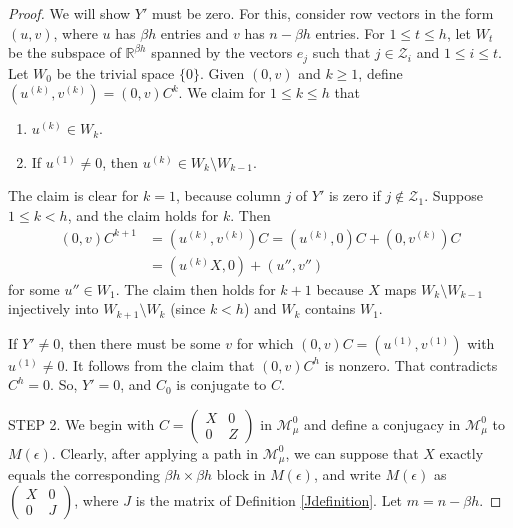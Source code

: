\documentclass{amsart}
\theoremstyle{definition}
\theoremstyle{remark}
\numberwithin{equation}{section}
\begin{document}
{{\begin{proof}
We will show $Y'$ must be zero. For this, 
 consider row vectors in the form $(u,v)$, where 
$u$ has $\beta h$ entries and $v$ has $n-\beta h$ 
entries. 
For $1\leq t \leq h$, 
let $W_t$ be the subspace of $\mathbb R^{\beta h}$ 
spanned by the vectors $e_j$ such that  $j\in \mathcal Z_i$ 
and $1\leq i \leq t$. Let $W_0$ be the trivial 
space $\{0\}$. 
Given $(0,v)$ and $k\geq 1$, 
define  
 $(u^{(k)},v^{(k)})
=(0,v)C^k$.  
We claim for $1\leq k\leq h$ that 
\begin{enumerate} 
\item 
 $u^{(k)}\in  W_k$. 
\item 
If $u^{(1)}\neq 0$, then 
$u^{(k)}\in 
 W_k\setminus W_{k-1}$. 
\end{enumerate} 
The claim is clear for $k=1$, because column 
$j$ of $Y'$ is zero if $j\notin \mathcal Z_1$.  
Suppose $1\leq k<h$,  and 
the claim  holds for $k$. 
 Then 
\begin{align*} 
(0,v)C^{k+1}&= (u^{(k)},v^{(k)})C=
(u^{(k)},0)C + (0,v^{(k)})C \\ 
&= (u^{(k)}X,0) + 
(u'',v'')
\end{align*}  
for some $u''\in W_1$.
The  claim then holds for $k+1$ 
 because $X$ maps 
$ W_k\setminus W_{k-1}$ injectively into 
$ W_{k+1}\setminus W_{k}$ (since $k<h$) 
and $W_k$ contains $W_1$. 

If $Y'\neq 0$, then there must be some $v$ for which 
$ (0,v)C= (u^{(1)},v^{(1)})$ with 
$u^{(1)}\neq 0$. It follows from the claim that 
$(0,v)C^h$ is nonzero. That contradicts 
$C^h=0$. So, $Y'=0$, and $C_0$ is conjugate to $C$. 

STEP 2. 
We begin with 
$C= 
\left(\begin{smallmatrix} X & 0 \\ 0 & Z 
\end{smallmatrix} \right)$ 
in $\mathcal M^0_{\mu}$ and 
define a conjugacy in 
 $\mathcal M^0_{\mu}$ 
 to 
$M(\epsilon)$. 
Clearly, after applying a path 
in $\mathcal M^0_{\mu}$, we can suppose that 
$X$ exactly equals the corresponding 
$\beta h \times \beta h$
block in  
 $M(\epsilon )$, and write 
 $M(\epsilon )$ as 
$ 
\left(\begin{smallmatrix} X & 0 \\ 0 & J  
\end{smallmatrix} \right)$, where 
$J$ is the matrix  of 
Definition \ref{Jdefinition}.
  Let $m=n-\beta h$. 


\end{proof}}}
\end{document}
